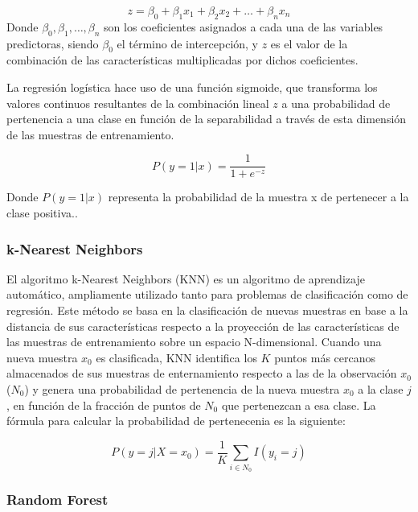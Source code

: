 \documentclass{uathesis-es}
\begin{document}
\[
z = \beta_0 + \beta_1 x_1 + \beta_2 x_2 + \dots + \beta_n x_n
\]
Donde $\beta_0, \beta_1, \dots, \beta_n$ son los coeficientes asignados a cada una de las variables predictoras, siendo $\beta_0$ el término de intercepción, y $z$ es el valor de la combinación de las características multiplicadas por dichos coeficientes.

La regresión logística hace uso de una función sigmoide, que transforma los valores continuos resultantes de la combinación lineal $z$ a una probabilidad de pertenencia a una clase en función de la separabilidad a través de esta dimensión de las muestras de entrenamiento.

\[
P(y = 1 | x) = \frac{1}{1 + e^{-z}}
\]

Donde $P(y = 1 | x)$ representa la probabilidad de la muestra x de pertenecer a la clase positiva..

\subsubsection*{k-Nearest Neighbors}

El algoritmo k-Nearest Neighbors (KNN) es un algoritmo de aprendizaje automático, ampliamente utilizado tanto para problemas de clasificación como de regresión. Este método se basa en la clasificación de nuevas muestras en base a la distancia de sus características respecto a la proyección de las características de las muestras de entrenamiento sobre un espacio N-dimensional. Cuando una nueva muestra $x_0$ es clasificada, KNN identifica los $K$ puntos más cercanos almacenados de sus muestras de enternamiento respecto a las de la observación $x_0$ ($N_0$) y genera una probabilidad de pertenencia de la nueva muestra $x_0$ a la clase $j$, en función de la fracción de puntos de $N_0$ que pertenezcan a esa clase. La fórmula para calcular la probabilidad de pertenecenia es la siguiente:

\[
P(y = j | X = x_0)  = \frac{1}{K} \sum_{i\in N_0} I(y_i = j)
\]


\subsubsection*{Random Forest}
\label{RF_INTRODUCTION_TO_ENSEMBLES}
\end{document}
